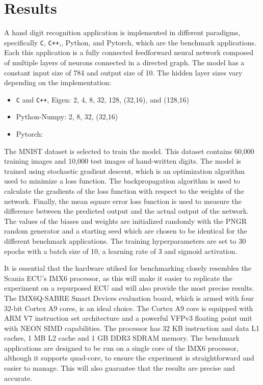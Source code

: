 \chapter{Results}

A hand digit recognition application is implemented in different paradigms, specifically \verb!C!, \verb!C++!,, Python, and Pytorch, which are the benchmark applications. Each this application is a fully connected feedforward neural network composed of multiple layers of neurons connected in a directed graph. The model has a constant input size of 784 and output size of 10. The hidden layer sizes vary depending on the implementation:

\begin{itemize}
	\item \verb!C! and \verb!C++!, Eigen: 2, 4, 8, 32, 128, (32,16), and (128,16)
	\item Python-Numpy: 2, 8, 32, (32,16)
	\item Pytorch:
\end{itemize}

The MNIST dataset is selected to train the model. This dataset contains 60,000 training images and 10,000 test images of hand-written digits. The model is trained using stochastic gradient descent, which is an optimization algorithm used to minimize a loss function. The backpropagation algorithm is used to calculate the gradients of the loss function with respect to the weights of the network. Finally, the mean square error loss function is used to measure the difference between the predicted output and the actual output of the network. The values of the biases and weights are initialized randomly with the PNGR random generator and a starting seed which are chosen to be identical for the different benchmark applications. The training hyperparameters are set to 30 epochs with a batch size of 10, a learning rate of 3 and sigmoid activation.

It is essential that the hardware utilsed for benchmarking closely resembles the Scania ECU's IMX6 processor, as this will make it easier to replicate the experiment on a repurposed ECU and will also provide the most precise results. The IMX6Q-SABRE Smart Devices evaluation board, which is armed with four 32-bit Cortex A9 cores, is an ideal choice. The Cortex A9 core is equipped with ARM V7 instruction set architecture and a powerful VFPv3 floating point unit with NEON SIMD capabilities. The processor has 32 KB instruction and data L1 caches, 1 MB L2 cache and 1 GB DDR3 SDRAM memory. The benchmark applications are designed to be run on a single core of the IMX6 processor, although it supports quad-core, to ensure the experiment is straightforward and easier to manage. This will also guarantee that the results are precise and accurate.

